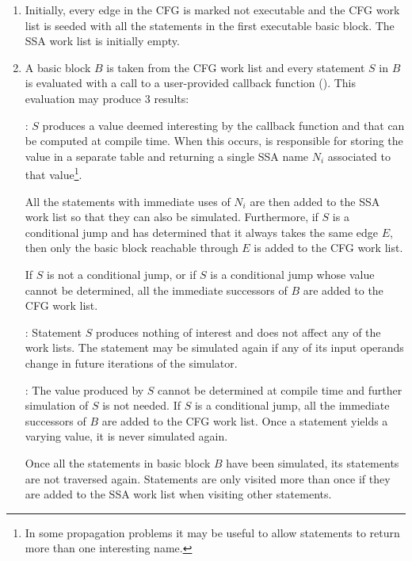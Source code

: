 \begin{enumerate}
\item	Initially, every edge in the CFG is marked not executable
	and the CFG work list is seeded with all the statements in
	the first executable basic block.  The SSA work list is
	initially empty.

\item	\label{novillo:prop-return-value}A basic block $B$ is
	taken from the CFG work list and every statement $S$ in
	$B$ is evaluated with a call to a user-provided callback
	function ().  This evaluation
	may produce 3 results:

	: $S$ produces a
	value deemed interesting by the callback function and
	that can be computed at compile time.  When this occurs,
	 is responsible for
	storing the value in a separate table and returning a
	single SSA name $N_i$ associated to that
	value\footnote{In some propagation problems it may be
	useful to allow statements to return more than one
	interesting name.}.

	All the statements with immediate uses of $N_i$ are then
	added to the SSA work list so that they can also be
	simulated.  Furthermore, if $S$ is a conditional jump and
	 has determined that it
	always takes the same edge $E$, then only the basic block
	reachable through $E$ is added to the CFG work list.

	If $S$ is not a conditional jump, or if $S$ is a
	conditional jump whose value cannot be determined, all
	the immediate successors of $B$ are added to the CFG
	work list.

	: Statement $S$
	produces nothing of interest and does not affect any of
	the work lists.  The statement may be simulated again if
	any of its input operands change in future iterations of
	the simulator.

	: The value produced
	by $S$ cannot be determined at compile time and further
	simulation of $S$ is not needed.  If $S$ is a conditional
	jump, all the immediate successors of $B$ are added to
	the CFG work list.  Once a statement yields a varying
	value, it is never simulated again.

	Once all the statements in basic block $B$ have been
	simulated, its statements are not traversed again.
	Statements are only visited more than once if they are
	added to the SSA work list when visiting other statements.


\end{enumerate}
